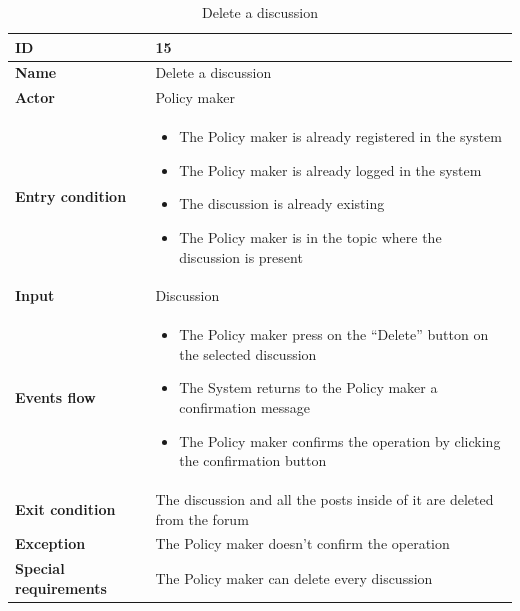  \begin{longtable}{p{} | p{}}
        \caption{Delete a discussion}
    \label{tab:pm_delete_discussion}\\
        \hline
        \textbf{ID} & 15\\
        \hline
        \textbf{Name}  &  Delete a discussion\\
        \hline
        \textbf{Actor}  &  Policy maker\\
        \hline
        \textbf{Entry condition}  &  \begin{itemize}
            \item  The Policy maker is already registered in the system
            \item  The Policy maker is already logged in the system
            \item The discussion is already existing
            \item  The Policy maker is in the topic where the discussion is present
        \end{itemize}\\
        \hline
        \textbf{Input} & Discussion\\
        \hline
        \textbf{Events flow} & \begin{itemize}
                \item The Policy maker press on the “Delete” button on the selected discussion
                \item The System returns to the Policy maker a confirmation message
                \item The Policy maker confirms the operation by clicking the confirmation button
                \end{itemize}
                 \\
        \hline
        \textbf{Exit condition} & The discussion and all the posts inside of it are deleted from the forum\\
        \hline
        \textbf{Exception} & The Policy maker doesn't confirm the operation\\ \hline
        \textbf{Special requirements} & The Policy maker can delete every discussion\\ \hline

    \end{longtable}
    
